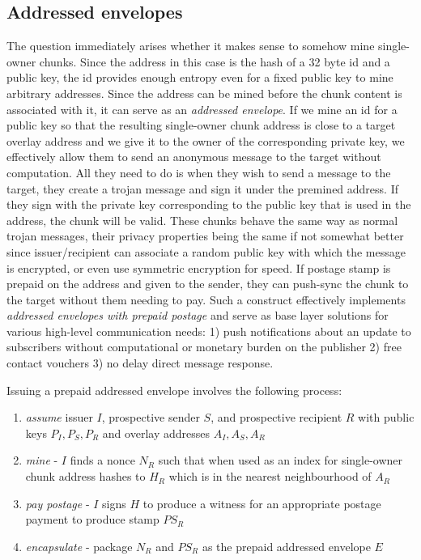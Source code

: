 \subsection{Addressed envelopes}\label{sec:addressed-envelopes}

The question immediately arises whether it makes sense to somehow mine single-owner chunks. Since the address in this case is the hash of a 32 byte id and a public key, the id provides enough entropy even for a fixed public key to mine arbitrary addresses. Since the address can be mined before the chunk content is associated with it, it can serve as an \emph{addressed envelope}. If we mine an id for a public key so that the resulting single-owner chunk address is close to a target overlay address and we give it to the owner of the corresponding private key, we effectively allow them to send an anonymous message to the target without computation. All they need to do is when they wish to send a message to the target, they create a trojan message and sign it under the premined address. If they sign with the private key corresponding to the public key that is used in the address, the chunk will be valid.
These chunks behave the same way as normal trojan messages, their privacy properties being the same if not somewhat better since issuer/recipient can associate a random public key with which the message is encrypted,  or even use symmetric encryption for speed. If postage stamp is prepaid on the address and given to the sender, they can push-sync the chunk to the target without them needing to pay. Such a construct effectively implements \emph{addressed envelopes with prepaid postage} and serve as base layer solutions for various high-level communication needs: 1) push notifications about an update to subscribers without computational or monetary burden on the publisher 2) free contact vouchers 3) no delay direct message response.  

Issuing a prepaid addressed envelope involves the following process:

\begin{enumerate}
    \item \emph{assume} issuer $I$, prospective sender $S$, and prospective recipient $R$ with public keys $P_I, P_S, P_R$ and overlay addresses $A_I, A_S, A_R$
\item \emph{mine} - $I$ finds a nonce $N_R$ such that when used as an index for single-owner chunk address hashes to $H_R$ which is in the nearest neighbourhood of $A_R$
\item \emph{pay postage} - $I$ signs $H$ to produce a witness for an appropriate postage payment to produce stamp $PS_R$ 
\item \emph{encapsulate} - package $N_R$ and $PS_R$ as the prepaid addressed envelope $E$ 
\end{enumerate}

